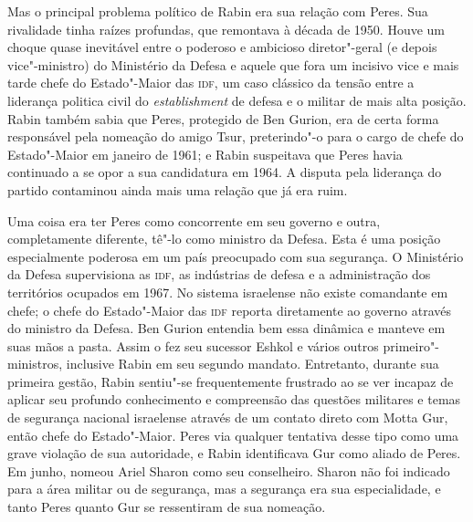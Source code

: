 Mas o principal problema político de Rabin era sua relação com Peres.
Sua rivalidade tinha raízes profundas, que remontava à década de 1950.
Houve um choque quase inevitável entre o poderoso e ambicioso diretor"-geral
(e depois vice"-ministro) do Ministério da Defesa e aquele que fora um incisivo
vice e mais tarde chefe do Estado"-Maior das \textsc{idf}, um caso clássico da
tensão entre a liderança politica civil do \textit{establishment} de
defesa e o militar de mais alta posição. Rabin também sabia que Peres,
protegido de Ben Gurion, era de certa forma responsável pela nomeação do
amigo Tsur, preterindo"-o para o cargo de chefe do Estado"-Maior em
janeiro de 1961; e Rabin suspeitava que Peres havia continuado a se opor
a sua candidatura em 1964. A disputa pela liderança do partido
contaminou ainda mais uma relação que já era ruim.

Uma coisa era ter Peres como concorrente em seu governo e outra,
completamente diferente, tê"-lo como ministro da Defesa. Esta é uma
posição especialmente poderosa em um país preocupado com sua segurança.
O Ministério da Defesa supervisiona as \textsc{idf}, as indústrias de defesa e a
administração dos territórios ocupados em 1967. No sistema israelense
não existe comandante em chefe; o chefe do Estado"-Maior das \textsc{idf} reporta
diretamente ao governo através do ministro da Defesa. Ben Gurion
entendia bem essa dinâmica e manteve em suas mãos a pasta.
Assim o fez seu sucessor Eshkol e vários outros primeiro"-ministros,
inclusive Rabin em seu segundo mandato. Entretanto, durante sua primeira gestão,
Rabin sentiu"-se frequentemente frustrado ao se ver incapaz de aplicar
seu profundo conhecimento e compreensão das questões militares e temas
de segurança nacional israelense através de um contato direto com Motta
Gur, então chefe do Estado"-Maior. Peres via qualquer tentativa desse
tipo como uma grave violação de sua autoridade, e Rabin identificava Gur
como aliado de Peres. Em junho, nomeou Ariel Sharon como seu
conselheiro. Sharon não foi indicado para a área militar ou de segurança,
mas a segurança era sua especialidade, e tanto Peres quanto Gur se
ressentiram de sua nomeação.

